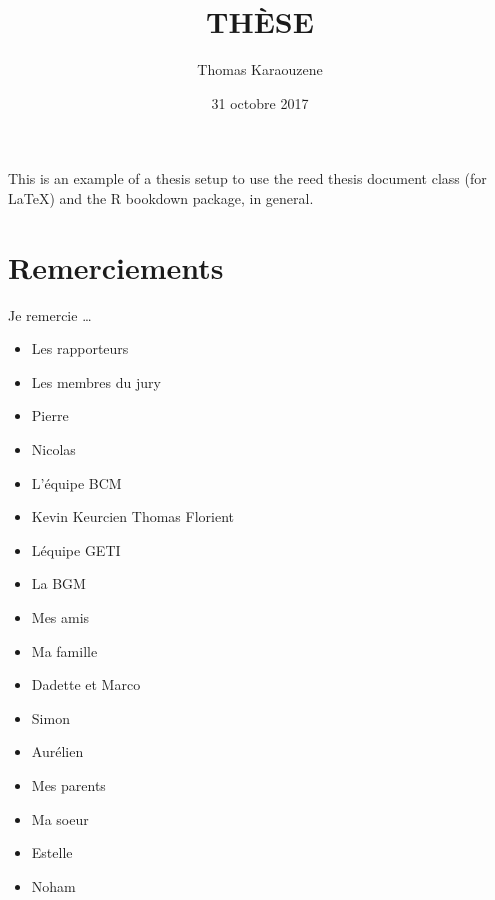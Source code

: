 \documentclass[12pt,twoside]{reedthesis}
\title{THÈSE}
\author{Thomas Karaouzene}
\date{31 octobre 2017}
\theoremstyle{definition}
\theoremstyle{definition}
\theoremstyle{remark}
\begin{document}
      \maketitle
  
  \frontmatter %
  \pagestyle{empty} %

  
      \begin{preface}
      This is an example of a thesis setup to use the reed thesis document
      class (for LaTeX) and the R bookdown package, in general.
    \end{preface}
  
      \hypersetup{linkcolor=black}
    \setcounter{tocdepth}{2}
    \tableofcontents
  
      \listoftables
  
      \listoffigures
  
  
  
  \mainmatter %
  \pagestyle{fancyplain} %

  \chapter*{Remerciements}\label{remerciements}
  
  Je remercie \ldots{}
  
  \begin{itemize}
  \item
    Les rapporteurs
  \item
    Les membres du jury\\
  \item
    Pierre\\
  \item
    Nicolas\\
  \item
    L'équipe BCM\\
  \item
    Kevin Keurcien Thomas Florient\\
  \item
    Léquipe GETI\\
  \item
    La BGM
  \item
    Mes amis\\
  \item
    Ma famille
  \item
    Dadette et Marco\\
  \item
    Simon\\
  \item
    Aurélien
  \item
    Mes parents\\
  \item
    Ma soeur
  \item
    Estelle\\
  \item
    Noham
  \end{itemize}
  
\end{document}
